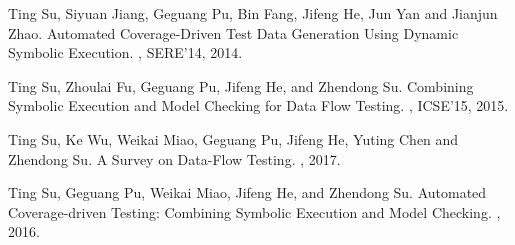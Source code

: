 \documentclass[a4paper]{article}
\begin{document}
{%
%
%







\begin{thebibliography}{99}
	
	\newblock Ting Su, Siyuan Jiang, Geguang Pu, Bin Fang, Jifeng He, Jun Yan and Jianjun Zhao.
	\newblock Automated Coverage-Driven Test Data Generation Using Dynamic Symbolic Execution.
	, SERE'14, 2014.
	
	\newblock Ting Su, Zhoulai Fu, Geguang Pu, Jifeng He, and Zhendong Su.
	\newblock Combining Symbolic Execution and Model Checking for Data Flow Testing.
	, ICSE'15, 2015.
	
	\newblock Ting Su, Ke Wu, Weikai Miao, Geguang Pu, Jifeng He, Yuting Chen and Zhendong Su.
	\newblock A Survey on Data-Flow Testing.
	, 2017.
	
	\newblock Ting Su, Geguang Pu, Weikai Miao, Jifeng He, and Zhendong Su.
	\newblock Automated Coverage-driven Testing: Combining Symbolic Execution and Model Checking. 
	, 2016.


\end{thebibliography}}
\end{document}
